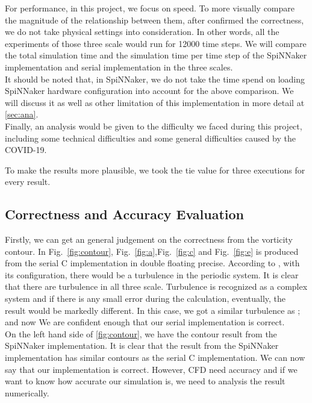 For performance, in this project, we focus on speed. To more visually compare the magnitude of the relationship between them, after confirmed the correctness, we do not take physical settings into consideration. In other words, all the experiments of those three scale would run for 12000 time steps. We will compare the total simulation time and the simulation time per time step of the SpiNNaker implementation and serial implementation in the three scales. \\

It should be noted that, in SpiNNaker, we do not take the time spend on loading SpiNNaker hardware configuration into account for the above comparison. We will discuss it as well as other limitation of this implementation in more detail at \ref{sec:ana}.\\

Finally, an analysis would be given to the difficulty we faced during this project, including some technical difficulties and some general difficulties caused by the COVID-19.

To make the results more plausible, we took the tie value for three executions for every result.\\
\subsection{Correctness and Accuracy Evaluation} \label{sec:caae}
Firstly, we can get an general judgement on the correctness from the vorticity contour. In Fig.~\ref{fig:contour}, Fig.~\ref{fig:a},Fig.~\ref{fig:c} and Fig.~\ref{fig:e} is produced from the serial C implementation in double floating precise. According to \cite{minion1997performance}, with its configuration, there would be a turbulence in the periodic system. It is clear that there are turbulence in all three scale. Turbulence is recognized as a complex system and if there is any small error during the calculation, eventually, the result would be markedly different. In this case, we got a similar turbulence as \cite{minion1997performance}; and now We are confident enough that our serial implementation is correct.\\

On the left hand side of \ref{fig:contour}, we have the contour result from the SpiNNaker implementation. It is clear that the result from the SpiNNaker implementation has similar contours as the serial C implementation. We can now say that our implementation is correct. However, CFD need accuracy and if we want to know how accurate our simulation is, we need to analysis the result numerically.\\

